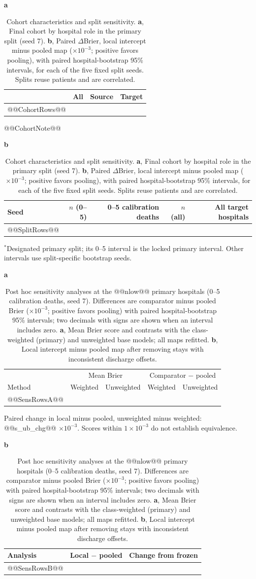 \documentclass[11pt]{article}
\begin{document}
\begin{table}[p]
\caption{Cohort characteristics and split sensitivity. \textbf{a}, Final cohort by hospital role in the primary split (seed 7). \textbf{b}, Paired $\Delta$Brier, local intercept minus pooled map ($\times10^{-3}$; positive favors pooling), with paired hospital-bootstrap 95\% intervals, for each of the five fixed split seeds. Splits reuse patients and are correlated.}
\label{tab:splits}
\centering\footnotesize
\textbf{a}\quad\begin{tabular}[t]{@{}lrrr@{}}
\toprule
 & All & Source & Target \\
\midrule
@@CohortRows@@
\bottomrule
\end{tabular}

\vspace{2pt}
{\scriptsize @@CohortNote@@}

\vspace{8pt}
\textbf{b}\quad\begin{tabular}[t]{@{}lrrrr@{}}
\toprule
Seed & $n$ (0--5) & 0--5 calibration deaths & $n$ (all) & All target hospitals \\
\midrule
@@SplitRows@@
\bottomrule
\end{tabular}

\vspace{2pt}
{\scriptsize $^*$Designated primary split; its 0--5 interval is the locked primary interval. Other intervals use split-specific bootstrap seeds.}
\end{table}

\begin{table}[p]
\caption{Post hoc sensitivity analyses at the @@nlow@@ primary hospitals (0--5 calibration deaths, seed 7). Differences are comparator minus pooled Brier ($\times10^{-3}$; positive favors pooling) with paired hospital-bootstrap 95\% intervals; two decimals with signs are shown when an interval includes zero. \textbf{a}, Mean Brier score and contrasts with the class-weighted (primary) and unweighted base models; all maps refitted. \textbf{b}, Local intercept minus pooled map after removing stays with inconsistent discharge offsets.}
\label{tab:sens}
\centering\footnotesize
\textbf{a}\quad\begin{tabular}[t]{@{}lrrrr@{}}
\toprule
 & \multicolumn{2}{c}{Mean Brier} & \multicolumn{2}{c}{Comparator $-$ pooled} \\
Method & Weighted & Unweighted & Weighted & Unweighted \\
\midrule
@@SensRowsA@@
\bottomrule
\end{tabular}

\vspace{2pt}
{\scriptsize Paired change in local minus pooled, unweighted minus weighted: @@s_ub_chg@@ $\times10^{-3}$. Scores within $1\times10^{-3}$ do not establish equivalence.}

\vspace{8pt}
\textbf{b}\quad\begin{tabular}[t]{@{}lrr@{}}
\toprule
Analysis & Local $-$ pooled & Change from frozen \\
\midrule
@@SensRowsB@@
\bottomrule
\end{tabular}
\end{table}
\end{document}
